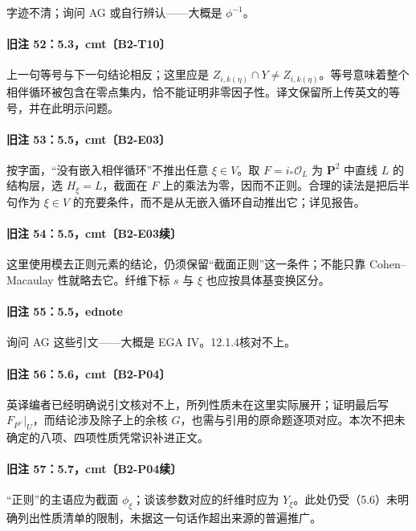 \documentclass[UTF8,a4paper]{ctexbook}
\newcommand{\OO}{\mathscr O}
\begin{document}
字迹不清；询问 AG 或自行辨认——大概是 $\phi^{-1}$。

\paragraph{旧注 52：5.3，cmt〔B2-T10〕}

上一句等号与下一句结论相反；这里应是 $Z_{i,k(\eta)}\cap Y\ne Z_{i,k(\eta)}$。等号意味着整个相伴循环被包含在零点集内，恰不能证明非零因子性。译文保留所上传英文的等号，并在此明示问题。

\paragraph{旧注 53：5.5，cmt〔B2-E03〕}

按字面，“没有嵌入相伴循环”不推出任意 $\xi\in V$。取 $F=i_*\OO_L$ 为 $\mathbf P^2$ 中直线 $L$ 的结构层，选 $H_\xi=L$，截面在 $F$ 上的乘法为零，因而不正则。合理的读法是把后半句作为 $\xi\in V$ 的充要条件，而不是从无嵌入循环自动推出它；详见报告。

\paragraph{旧注 54：5.5，cmt〔B2-E03续〕}

这里使用模去正则元素的结论，仍须保留“截面正则”这一条件；不能只靠 Cohen--Macaulay 性就略去它。纤维下标 $s$ 与 $\xi$ 也应按具体基变换区分。

\paragraph{旧注 55：5.5，ednote}

询问 AG 这些引文——大概是 EGA IV。12.1.4核对不上。

\paragraph{旧注 56：5.6，cmt〔B2-P04〕}

英译编者已经明确说引文核对不上，所列性质未在这里实际展开；证明最后写 $F_{P^\vee}|_U$，而结论涉及除子上的余核 $G$，也需与引用的原命题逐项对应。本次不把未确定的八项、四项性质凭常识补进正文。

\paragraph{旧注 57：5.7，cmt〔B2-P04续〕}

“正则”的主语应为截面 $\phi_\xi$；谈该参数对应的纤维时应为 $Y_\xi$。此处仍受（5.6）未明确列出性质清单的限制，未据这一句话作超出来源的普遍推广。
\end{document}
